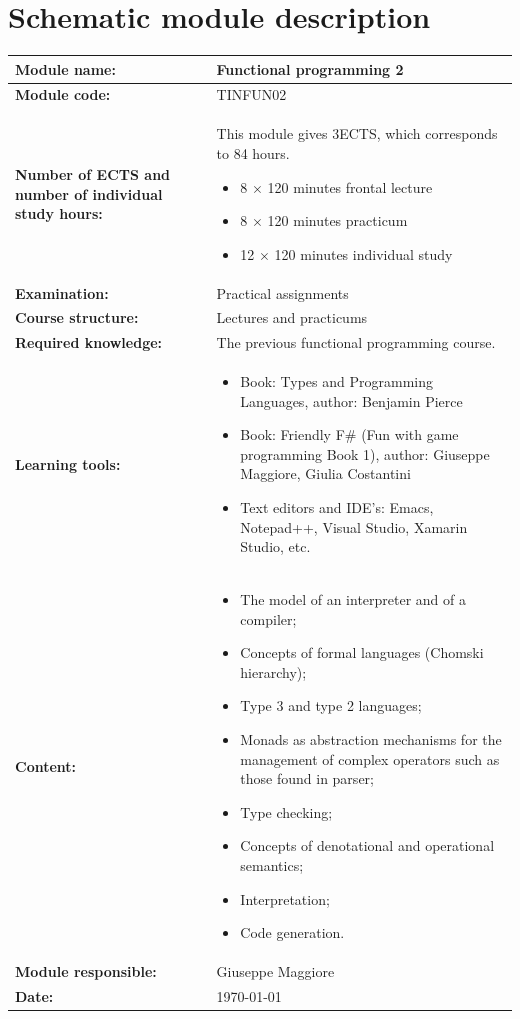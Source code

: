 \documentclass[a4paper, 10pt]{article}
\newcommand{\modulenaam}{Functional programming 2}
\newcommand{\modulecode}{\uppercase{TINFUN02}}
\newcommand{\stdPunten}{3}
\renewcommand{\author}{Giuseppe Maggiore}
\begin{document}
\section{Schematic module description}
\begin{tabularx}{\textwidth}{|>{\columncolor{lichtGrijs}} p{}|X|}
	\hline
	\textbf{Module name:} & \modulenaam\\
	\hline
	\textbf{Module code: }& \modulecode\\
	\hline
	\textbf{Number of ECTS \newline and number of individual study hours:} & This module gives \stdPunten ECTS, which corresponds to 84 hours.
	\begin{itemize}
		\item 8 $\times$ 120 minutes frontal lecture
		\item 8 $\times$ 120 minutes practicum
		\item 12 $\times$ 120 minutes individual study
	\end{itemize} \\
	\hline
	\textbf{Examination:} & Practical assignments \\
	\hline
	\textbf{Course structure:} & Lectures and practicums \\
	\hline
	\textbf{Required knowledge:} & The previous functional programming course. \\
	\hline
	\textbf{Learning tools:}  &
		\begin{itemize}
			\item Book: Types and Programming Languages, author: Benjamin Pierce
			\item Book: Friendly F\# (Fun with game programming Book 1), author: Giuseppe Maggiore, Giulia Costantini
			\item Text editors and IDE's: Emacs, Notepad++, Visual Studio, Xamarin Studio, etc.
		\end{itemize} \\
	\hline
	\textbf{Content:}&
	\begin{itemize}
		\item The model of an interpreter and of a compiler;
		\item Concepts of formal languages (Chomski hierarchy);
		\item Type 3 and type 2 languages;
		\item Monads as abstraction mechanisms for the management of complex operators such as those found in parser;
		\item Type checking;
		\item Concepts of denotational and operational semantics;
		\item Interpretation;
		\item Code generation.
	\end{itemize}\\
	\hline
	\textbf{Module responsible:} & \author\\
	\hline
	\textbf{Date:} & \today \\
	\hline
\end{tabularx}
\end{document}
